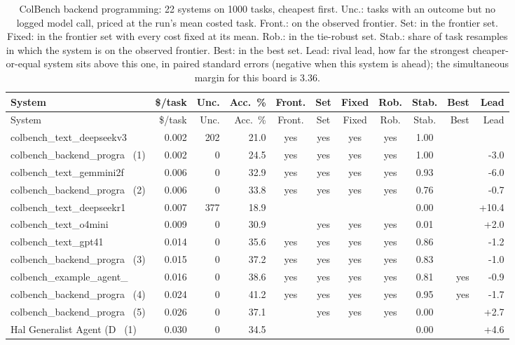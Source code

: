 {\begin{longtable}{lrrrcccccrr}
\caption{ColBench backend programming: 22 systems on 1000 tasks, cheapest first. Unc.: tasks with an outcome but no logged model call, priced at the run's mean costed task. Front.: on the observed frontier. Set: in the frontier set. Fixed: in the frontier set with every cost fixed at its mean. Rob.: in the tie-robust set. Stab.: share of task resamples in which the system is on the observed frontier. Best: in the best set. Lead: rival lead, how far the strongest cheaper-or-equal system sits above this one, in paired standard errors (negative when this system is ahead); the simultaneous margin for this board is 3.36.}\label{tab:supp-hal_colbench_backend_programming}\\
\toprule
System & \$/task & Unc. & Acc.\ \% & Front. & Set & Fixed & Rob. & Stab. & Best & Lead \\
\midrule
\endfirsthead
\toprule
System & \$/task & Unc. & Acc.\ \% & Front. & Set & Fixed & Rob. & Stab. & Best & Lead \\
\midrule
\endhead
\bottomrule
\endfoot
colbench\_text\_deepseekv3 & 0.002 & 202 & 21.0 & yes & yes & yes & yes & 1.00 &  &  \\
colbench\_backend\_progra~ (1) & 0.002 & 0 & 24.5 & yes & yes & yes & yes & 1.00 &  & -3.0 \\
colbench\_text\_gemmini2f~ & 0.006 & 0 & 32.9 & yes & yes & yes & yes & 0.93 &  & -6.0 \\
colbench\_backend\_progra~ (2) & 0.006 & 0 & 33.8 & yes & yes & yes & yes & 0.76 &  & -0.7 \\
colbench\_text\_deepseekr1 & 0.007 & 377 & 18.9 &  &  &  &  & 0.00 &  & +10.4 \\
colbench\_text\_o4mini & 0.009 & 0 & 30.9 &  & yes & yes & yes & 0.01 &  & +2.0 \\
colbench\_text\_gpt41 & 0.014 & 0 & 35.6 & yes & yes & yes & yes & 0.86 &  & -1.2 \\
colbench\_backend\_progra~ (3) & 0.015 & 0 & 37.2 & yes & yes & yes & yes & 0.83 &  & -1.0 \\
colbench\_example\_agent\_~ & 0.016 & 0 & 38.6 & yes & yes & yes & yes & 0.81 & yes & -0.9 \\
colbench\_backend\_progra~ (4) & 0.024 & 0 & 41.2 & yes & yes & yes & yes & 0.95 & yes & -1.7 \\
colbench\_backend\_progra~ (5) & 0.026 & 0 & 37.1 &  & yes & yes & yes & 0.00 &  & +2.7 \\
Hal Generalist Agent (D~ (1) & 0.030 & 0 & 34.5 &  &  &  &  & 0.00 &  & +4.6 \\

\end{longtable}}
